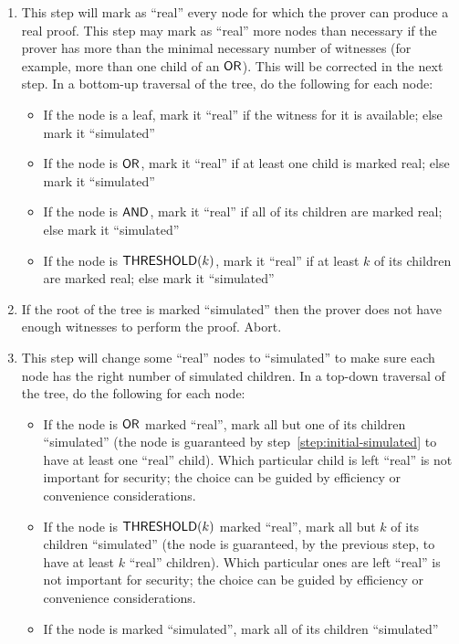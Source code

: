 \documentclass[11pt]{llncs}
\begin{document}
\begin{enumerate}
    \item \label{step:initial-simulated} This step will mark as ``real'' every node for which the prover can produce a real proof. This step may mark as ``real'' more nodes than necessary if the prover has more than the minimal necessary number of witnesses (for example, more than one child of an $\mathsf{OR}$).  This will be corrected in the next step. In a bottom-up traversal of the tree, do the following for each node:
        \begin{itemize}
            \item If the node is a leaf, mark it ``real'' if the witness for it is available; else mark it ``simulated''
            \item If the node is $\mathsf{OR}$, mark it ``real'' if at least one child is marked real; else mark it ``simulated''
            \item If the node is $\mathsf{AND}$, mark it ``real'' if all of its children are marked real; else mark it ``simulated''
            \item If the node is $\mathsf{THRESHOLD}(k)$, mark it ``real'' if at least $k$ of its children are marked real; else mark it ``simulated''
        \end{itemize}
    
    \item If the root of the tree is marked ``simulated'' then the prover does not have enough witnesses to perform the proof. Abort.
    
    \item This step will change some ``real'' nodes to ``simulated'' to make sure each node has the right number of simulated children.
          In a top-down traversal of the tree, do the following for each node:
        \begin{itemize}
            \item
            If the node is $\mathsf{OR}$ marked ``real'',  mark all but one of its children ``simulated''
            (the node is guaranteed by step~\ref{step:initial-simulated} to have at least one ``real'' child).
            Which particular child is left ``real'' is not important for security; the choice can be guided by efficiency or convenience considerations.
            \item
            If  the node is $\mathsf{THRESHOLD}(k)$ marked ``real'', mark all but $k$ of its children ``simulated''
            (the node is guaranteed, by the previous step, to have at least $k$ ``real'' children).
            Which particular ones are left ``real'' is not important for security; the choice can be guided by efficiency or convenience considerations.
            \item
            If the node is marked ``simulated'', mark all of its children ``simulated''
        \end{itemize}
\end{enumerate}
\end{document}
